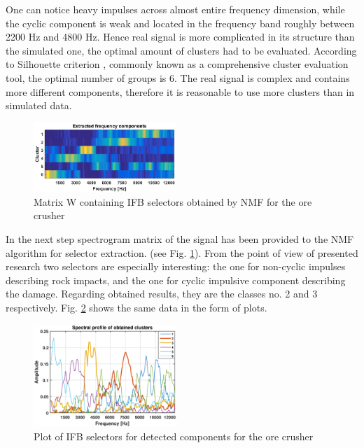 \documentclass[journal]{IEEEtran}
\begin{document}
One can notice heavy impulses across almost entire frequency dimension, while the cyclic component is weak and located in the frequency band roughly between 2200 Hz and 4800 Hz. Hence real signal is more complicated in its structure than the simulated one, the optimal amount of clusters had to be evaluated. According to Silhouette criterion \cite{kaufman2009finding,rousseeuw1987silhouettes}, commonly known as a comprehensive cluster evaluation tool, the optimal number of groups is 6. The real signal is complex and contains more different components, therefore it is reasonable to use more clusters than in simulated data.

\begin{figure}[!ht]
\centering
\includegraphics[width = 0.48\textwidth]{figs3/profiles1}
\caption{Matrix W containing IFB selectors obtained by NMF for the ore crusher}
\label{fig: mat2}
\end{figure}

In the next step spectrogram matrix of the signal has been provided to the NMF algorithm for selector extraction. (see Fig. \ref{fig: mat2}). From the point of view of presented research two selectors are especially interesting: the one for non-cyclic impulses describing rock impacts, and the one for cyclic impulsive component describing the damage. Regarding obtained results, they are the classes no. 2 and 3 respectively. Fig. \ref{fig: filt2} shows the same data in the form of plots.

\begin{figure}[!ht]
\centering
\includegraphics[width = 0.48\textwidth]{figs3/filt.eps}
\caption{Plot of IFB selectors for detected components for the ore crusher}
\label{fig: filt2}
\end{figure}
\end{document}

